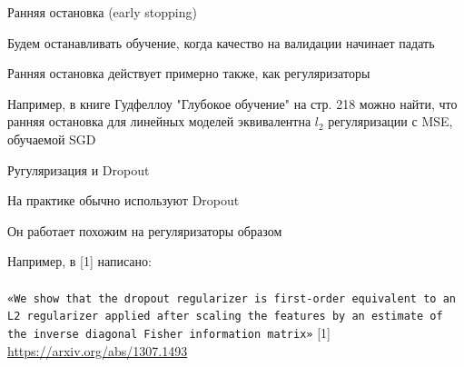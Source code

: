 \documentclass[notes,12pt, aspectratio=169]{beamer}
\newenvironment{wideitemize}{\itemize\addtolength{\itemsep}{10pt}}{\enditemize}
\begin{document}
\begin{frame}{Ранняя остановка (early stopping)}
\begin{wideitemize}
	\item  Будем останавливать обучение, когда качество на валидации начинает падать
	\item  Ранняя остановка действует примерно также, как регуляризаторы 
	\item  Например, в книге  Гудфеллоу "Глубокое обучение" на стр. 218 можно найти, что ранняя остановка для линейных моделей эквивалентна $l_2$ регуляризации с MSE, обучаемой SGD
\end{wideitemize}
\end{frame}


\begin{frame}{Ругуляризация и Dropout}
\begin{wideitemize}
	\item  На практике обычно используют Dropout
	
	\item Он работает похожим на регуляризаторы образом
	
	\item Например, в [1] написано: \\ \mbox{   } \\
	
	\texttt{«We show that the dropout regularizer is first-order equivalent to an L2 regularizer applied after scaling the features by an estimate of the inverse diagonal Fisher information matrix»}
\end{wideitemize}
\vfill %
\footnotesize 
\color{blue} [1] \url{https://arxiv.org/abs/1307.1493} 
\end{frame}
\end{document}
